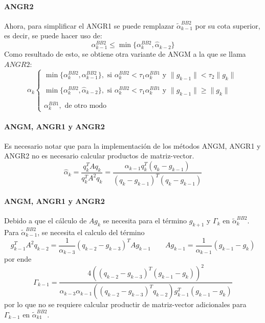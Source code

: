 \begin{frame}{\insertsectionhead}
    \framesubtitle{ANGR2}
    Ahora, para simplificar el ANGR1 se puede remplazar $\tilde{\alpha}_{k-1}^{BB2}$ por su cota superior, es decir, se puede hacer uso de:
    \begin{equation*}
        \alpha_{k-1}^{BB2}\leq \min{\{\alpha_k^{BB2}, \hat{\alpha}_{k-2}\}}
    \end{equation*}
    Como resultado de esto, se obtiene otra variante de ANGM a la que se llama $ANGR2$:
    \begin{equation}
        \alpha_k \begin{cases} \min\{\alpha_k^{BB2}, \alpha_{k-1}^{BB2}\}, \text{ \ si \ } \alpha_k^{BB2}<\tau_1\alpha_k^{BB1}\text{ \ y \ } \|g_{k-1}\|<\tau_2\|g_k\|    \\\\
            \min{\{\alpha_k^{BB2}, \hat{\alpha}_{k-2}\}}, \text{ \ si \ } \alpha_k^{BB2} < \tau_1\alpha_k^{BB1} \text{ \ y \ } \|g_{k-1}\|\geq \|g_k\| \\\\
            \alpha_k^{BB1}, \text{ \ de otro modo \ }
        \end{cases}
        \label{eq:ANGR2}
    \end{equation}
\end{frame}

\begin{frame}{\insertsectionhead}
    \framesubtitle{ANGM, ANGR1 y ANGR2}
    Es necesario notar que para la implementación de los métodos ANGM, ANGR1 y ANGR2 no es necesario calcular productos de matriz-vector.
    \begin{equation}
        \hat{\alpha}_k= \frac{q_k^T A q_k}{q_k^T A^2 q_k} = \frac{\alpha_{k-1}q_k^T(q_k-g_{k-1})}{(q_k - g_{k-1})^T(q_k-g_{k-1})}
    \end{equation}
\end{frame}

\begin{frame}{\insertsectionhead}
    \framesubtitle{ANGM, ANGR1 y ANGR2}
    Debido a que el cálculo de $Ag_k$ se necesita para el término $g_{k+1}$ y $\Gamma_k$ en $\tilde{\alpha}_k^{BB2}$. Para $\tilde{\alpha}_{k-1}^{BB2}$, se necesita el calculo del término
    \begin{equation*}
        g_{k-1}^TA^2q_{k-2} = \frac{1}{\alpha_{k-3}}(q_{k-2}-g_{k-3})^TAg_{k-1} \qquad Ag_{k-1}=\frac{1}{\alpha_{k-1}}(g_{k-1}-g_k)
    \end{equation*}
    por ende
    \begin{equation*}
        \Gamma_{k-1}  = \frac{4((q_{k-2}-g_{k-3})^T(g_{k-1}-g_k))^2}{\alpha_{k-3}\alpha_{k-1}((q_{k-2}-g_{k-3})^Tq_{k-2})g_{k-1}^T(g_{k-1}-g_k)}
    \end{equation*}
    por lo que no se requiere calcular productir de matriz-vector adicionales para $\Gamma_{k-1}$ en $\tilde{\alpha}_{k1}^{BB2}$.
\end{frame}

